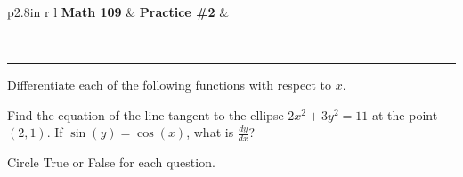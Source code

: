 \documentclass[11pt]{exam}
\newcommand{\class}{Math 109}
\newcommand*{\TrueFalse}[1]{%
\ifprintanswers
    \ifthenelse{\equal{#1}{T}}{%
        \textbf{TRUE}\hspace*{14pt}False
    }{
        True\hspace*{14pt}\textbf{FALSE}
    }
\else
    {True}\hspace*{20pt}False
\fi
}
\newlength\TFlengthA
\newlength\TFlengthB
\newcommand\TFQuestion[2]{%
    \setlength\TFlengthB{\linewidth}
    \addtolength\TFlengthB{-\TFlengthA}
    \parbox[t]{\TFlengthA}{\TrueFalse{#1}}\parbox[t]{\TFlengthB}{#2}}
\begin{document}
 

\pagestyle{head}

\begin{flushright}
\begin{tabular}{p{2.8in} r l}
\textbf{\class} & \textbf{Practice \#2} & \makebox[2in]{}\\
\end{tabular}\\
\end{flushright}
\rule[1ex]{\textwidth}{.1pt}

\begin{questions}
\question Differentiate each of the following functions with respect to $x$.
\bigskip\bigskip\bigskip\bigskip\bigskip
	\question Find the equation of the line tangent to the ellipse $2x^2 + 3y^2 = 11$ at the point $(2,1)$.
	\bigskip\bigskip\bigskip\bigskip
	\question If $\sin(y) = \cos(x)$, what is $\frac{dy}{dx}$?
		\bigskip\bigskip\bigskip\bigskip

\question Circle True or False for each question.  
\end{questions}
\end{document}
